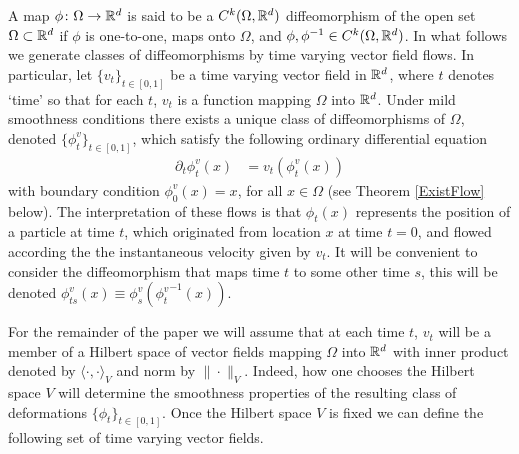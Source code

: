 \documentclass[noinfoline]{imsart}
\begin{document}
A map $\phi\colon \Omega \rightarrow\Bbb R^d$ is said to be a $C^k(\Omega,\Bbb R^d)$ diffeomorphism of the open set $\Omega \subset \Bbb R^d$ if  $\phi$ is one-to-one, maps onto $\Omega$, and  $\phi, \phi^{-1}\in C^{k}(\Omega,\Bbb R^d)$.  In what follows we generate classes of diffeomorphisms by time varying vector field flows. In particular, let  $\{ v_t\}_{t\in [0,1]}$  be a time varying vector field in $\Bbb R^d$, where $t$ denotes  `time' so that for each $t$, $v_t$ is a function mapping $\Omega$ into $\Bbb R^d$. Under mild smoothness conditions there exists a unique class of diffeomorphisms of $\Omega$, denoted $\{ \phi_t^v\}_{t\in [0,1]}$, which satisfy the following ordinary differential equation
\begin{align}
\label{ood}
 \partial_t \phi_t^v(x) &= v_t(\phi_t^v(x))
 \end{align}
 with boundary condition $\phi_0^v(x)=x$, for all $x\in \Omega$ (see Theorem \ref{ExistFlow} below). The interpretation of these flows is that $\phi_t(x)$ represents the position of a particle at time $t$, which originated from location $x$ at time $t=0$, and flowed according the the instantaneous velocity given by $v_t$. It will be convenient to consider the diffeomorphism that maps time $t$ to some other time $s$, this will be denoted $\phi_{ts}^{ v}(x)\equiv \phi_{s}^{v}( {\phi_{t}^{ v}}^{-1}(x)) $.

For the remainder of the paper we will assume that at each time $t$, $v_t$ will be a member of a  Hilbert space of vector fields mapping  $\Omega$ into $\Bbb R^d$ with inner product denoted by $\langle\cdot, \cdot \rangle_V$ and norm by $\|  \cdot \|_V$. 
Indeed, how one chooses the Hilbert space $V$ will determine the smoothness properties of the resulting class of deformations $\{\phi_t\}_{t\in[0,1]}$.  Once the Hilbert space $V$ is fixed we can define the following set of time varying vector fields.
\end{document}
